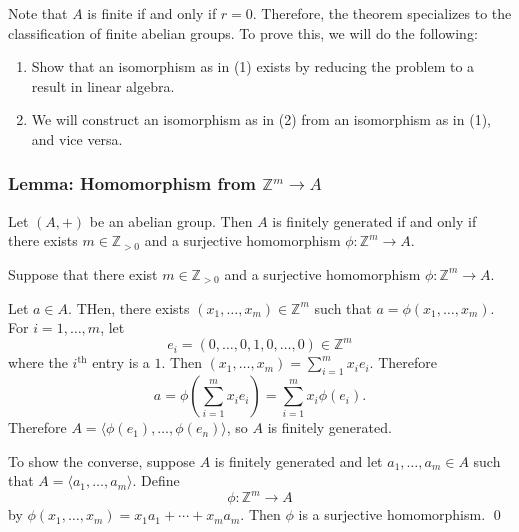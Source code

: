 \documentclass{article}
\renewenvironment{proof}{{\bfseries\color{blue1} Proof:}}{\qed}
\begin{document}
Note that $A$ is finite if and only if $r=0$. Therefore, the theorem specializes to the classification of finite abelian groups. To prove this, we will do the following:
\begin{enumerate}
    \item Show that an isomorphism as in (1) exists by reducing the problem to a result in linear algebra.
    \item We will construct an isomorphism as in (2) from an isomorphism as in (1), and vice versa.
\end{enumerate}
\subsubsection{Lemma: Homomorphism from $\mathbb{Z}^m \rightarrow A$}
\begin{idea}
    Let $(A,+)$ be an abelian group. Then $A$ is finitely generated if and only if there exists $m\in \mathbb{Z}_{>0}$ and a surjective homomorphism $\phi:\mathbb{Z}^m \rightarrow A$.
\end{idea}
\begin{proof}
    Suppose that there exist $m\in \mathbb{Z}_{>0}$ and a surjective homomorphism $\phi: \mathbb{Z}^m \rightarrow A$.

    Let $a \in A$. THen, there exists $(x_1,\dots,x_m)\in \mathbb{Z}^m$ such that $a = \phi(x_1,\dots,x_m)$. For $i=1,\dots,m$, let
    \begin{equation}
        e_i = (0,\dots,0,1,0,\dots,0)\in \mathbb{Z}^m
    \end{equation}
    where the $i^\text{th}$ entry is a $1$. Then $(x_1,\dots,x_m) = \sum_{i=1}^m x_ie_i$. Therefore
    \begin{equation}
        a = \phi\left(\sum_{i=1}^mx_ie_i\right) = \sum_{i=1}^m x_i \phi(e_i).
    \end{equation}
    Therefore $A = \langle \phi(e_1),\dots,\phi(e_n)\rangle$, so $A$ is finitely generated.

    To show the converse, suppose $A$ is finitely generated and let $a_1,\dots,a_m\in A$ such that $A = \langle a_1,\dots, a_m\rangle$. Define
    \begin{equation}
        \phi: \mathbb{Z}^m \rightarrow A
    \end{equation}
    by $\phi(x_1,\dots,x_m)=x_1a_1+\cdots + x_ma_m$. Then $\phi$ is a surjective homomorphism.
\end{proof}
\end{document}
